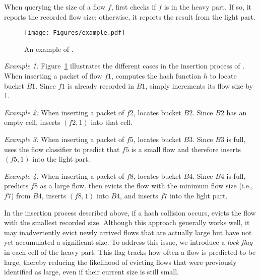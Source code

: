 %
When querying the size of a flow \(f\), \alg{} first checks if \(f\) is in the heavy part. If so, it reports the recorded flow size; otherwise, it reports the result from the light part.


\begin{figure}[!ht]
    \centering  
    \texttt{[image: Figures/example.pdf]}
    \caption{An example of \alg{}.}
    \label{fig:example}
\end{figure}




\textit{Example 1:} Figure~\ref{fig:example} illustrates the different cases in the insertion process of \alg{}.
%
When inserting a packet of flow \(f1\), \alg{} computes the hash function \(h\) to locate bucket \(B1\). Since \(f1\) is already recorded in \(B1\), \alg{} simply increments its flow size by 1.


\textit{Example 2:} When inserting a packet of \(f2\), \alg{} locates bucket \(B2\). Since \(B2\) has an empty cell, \alg{} inserts \((f2, 1)\) into that cell.


\textit{Example 3:} When inserting a packet of \(f5\), \alg{} locates bucket \(B3\). Since \(B3\) is full, \alg{} uses the flow classifier to predict that \(f5\) is a small flow and therefore inserts \((f5, 1)\) into the light part.


\textit{Example 4:} When inserting a packet of \(f8\), \alg{} locates bucket \(B4\). Since \(B4\) is full, \alg{} predicts \(f8\) as a large flow. \alg{} then evicts the flow with the minimum flow size (i.e., \(f7\)) from \(B4\), inserts \((f8, 1)\) into \(B4\), and inserts \(f7\) into the light part.






%
In the insertion process described above, if a hash collision occurs, \alg{} evicts the flow with the smallest recorded size. Although this approach generally works well, it may inadvertently evict newly arrived flows that are actually large but have not yet accumulated a significant size. To address this issue, we introduce a \textit{lock flag} in each cell of the heavy part. This flag tracks how often a flow is predicted to be large, thereby reducing the likelihood of evicting flows that were previously identified as large, even if their current size is still small.


